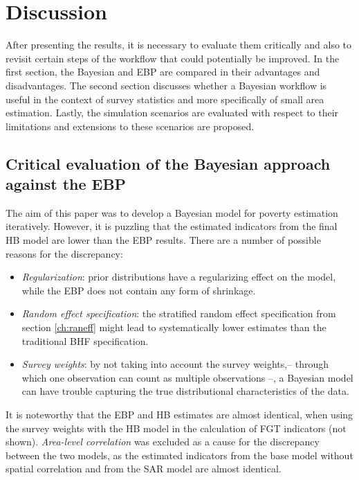 \chapter{Discussion}

After presenting the results, it is necessary to evaluate them critically and also to revisit certain steps of the workflow that could potentially be improved.
In the first section, the Bayesian and EBP are compared in their advantages and disadvantages.
The second section discusses whether a Bayesian workflow is useful in the context of survey statistics and more specifically of small area estimation.
Lastly, the simulation scenarios are evaluated with respect to their limitations and extensions to these scenarios are proposed.


\section{Critical evaluation of the Bayesian approach against the EBP}
\label{ch:discussion}

The aim of this paper was to develop a Bayesian model for poverty estimation iteratively.
However, it is puzzling that the estimated indicators from the final HB model are lower than the EBP results.
There are a number of possible reasons for the discrepancy:
\begin{itemize}
    \item \textit{Regularization}: prior distributions have a regularizing effect on the model, while the EBP does not contain any form of shrinkage.
    \item \textit{Random effect specification}: the stratified random effect specification from section \ref{ch:raneff} might lead to systematically lower estimates than the traditional BHF specification.
    \item \textit{Survey weights}: by not taking into account the survey weights,– through which one observation can count as multiple observations –, a Bayesian model can have trouble capturing the true distributional characteristics of the data.
\end{itemize}
It is noteworthy that the EBP and HB estimates are almost identical, when using the survey weights with the HB model in the calculation of FGT indicators (not shown).
\textit{Area-level correlation} was excluded as a cause for the discrepancy between the two models, as the estimated indicators from the base model without spatial correlation and from the SAR model are almost identical.

